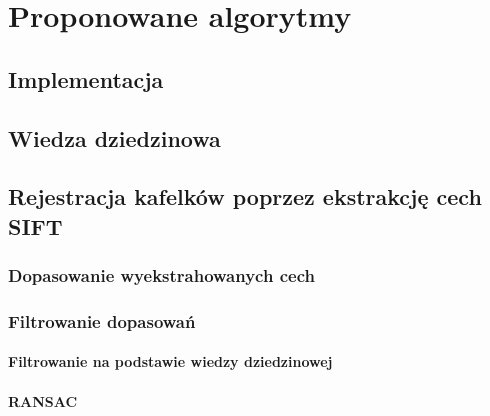 %
\chapter{Proponowane algorytmy}
\label{sec:proponowane_algorytmy}


\section{Implementacja}
\label{sec:proponowane_algorytmy:implementacja}


\section{Wiedza dziedzinowa}
\label{sec:proponowane_algorytmy:wiedza_dziedzinowa}


\section{Rejestracja kafelków poprzez ekstrakcję cech SIFT}
\label{sec:proponowane_algorytmy:sift}

\subsection{Dopasowanie wyekstrahowanych cech}
\label{sec:proponowane_algorytmy:filtrowanie}

\subsection{Filtrowanie dopasowań}
\label{sec:proponowane_algorytmy:filtrowanie}

\subsubsection{Filtrowanie na podstawie wiedzy dziedzinowej}
\label{sec:proponowane_algorytmy:filtrowanie_dziedzinowe}

\subsubsection{RANSAC}
\label{sec:proponowane_algorytmy:ransac}

